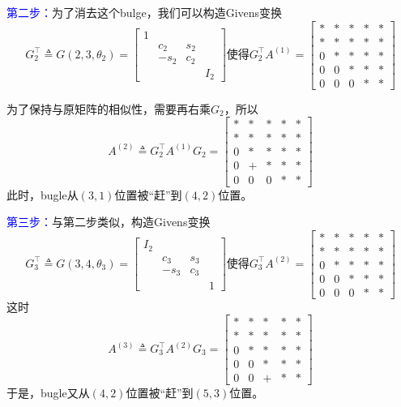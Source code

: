 \documentclass[12pt,a4paper]{article}
\begin{document}
\textcolor{blue}{第二步：}\quad 为了消去这个bulge，我们可以构造Givens变换$$
G_{2}^{\top} \triangleq G\left(2,3, \theta_{2}\right)=\left[\begin{array}{cccc}{1} & {} & {} &\\ {} & {c_{2}} & {s_{2}}& \\ {} & {-s_{2}} & {c_{2}} &\\ {} & {} && {I_{2}}\end{array}\right]
\text{使得}G_{2}^{\top} A^{(1)}=\left[\begin{array}{ccccc}{*} & {*} & {*} & {*}& {*}\\ {*} & {*} & {*} & {*} & {*}\\ {0} & {*} & {*} & {*}& {*} \\ {0} & {0} & {*} & {*}& {*} \\ {0} & {0} & {0} & {*}& {*}\end{array}\right]$$

为了保持与原矩阵的相似性，需要再右乘$G_2$，所以$$
A^{(2)} \triangleq G_{2}^{\top} A^{(1)} G_{2}=\left[\begin{array}{ccccc}{*} & {*} & {*} & {*}& {*}\\ {*} & {*} & {*} & {*}& {*}\\ {0} & {*} & {*}& {*}& {*} \\ {0} & {+} & {*} & {*}& {*}\\ {0} & {0} & {0} & {*}& {*}\end{array}\right]
$$
此时，bugle从$(3,1)$位置被“赶”到$(4,2)$位置。

\textcolor{blue}{第三步：}\quad 与第二步类似，构造Givens变换$$
G_{3}^{\top} \triangleq G\left(3,4, \theta_{3}\right)=\left[\begin{array}{cccc}{I_{2}} & {} & {}& {} \\ {} & {c_{3}} & {s_{3}} & {}\\ {} & {-s_{3}}& { c_{3}} & {}\\ {} & {}& {} & {1}\end{array}\right]
\text{使得}G_{3}^{\top} A^{(2)}=\left[\begin{array}{ccccc}{*} & {*} & {*} & {*}& {*}\\ {*} & {*} & {*} & {*} & {*}\\ {0} & {*} & {*} & {*}& {*} \\ {0} & {0} & {*} & {*}& {*} \\ {0} & {0} & {0} & {*}& {*}\end{array}\right]
$$这时$$
A^{(3)} \triangleq G_{3}^{\top} A^{(2)} G_{3}=\left[\begin{array}{ccccc}{*} & {*} & {*} & {*}& {*}\\ {*} & {*} & {*} & {*}& {*}\\ {0} & {*} & {*}& {*}& {*} \\ {0} & {0} & {*} & {*}& {*}\\ {0} & {0} & {+} & {*}& {*}\end{array}\right]
$$
于是，bugle又从$(4,2)$位置被“赶”到$(5,3)$位置。
\end{document}
